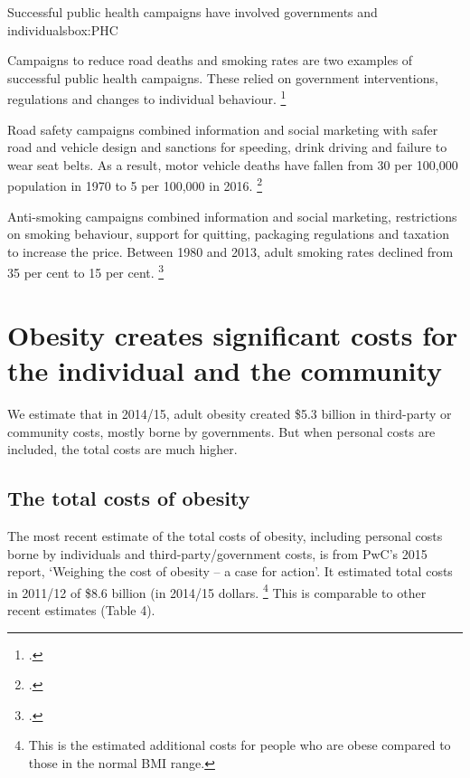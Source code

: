 \documentclass[embargoed]{grattan}
\begin{document}
\begin{smallbox}{Successful public health campaigns have involved governments and individuals}{box:PHC}

Campaigns to reduce road deaths and smoking rates are two examples of successful public health campaigns.
These relied on government interventions, regulations and changes to individual behaviour.%
\footcite{MacKay2011Legislativesolutionsunhealthy}

Road safety campaigns combined information and social marketing with safer road and vehicle design and sanctions for speeding, drink driving and failure to wear seat belts.
As a result, motor vehicle deaths have fallen from 30 per 100,000 population in 1970 to 5 per 100,000 in 2016.%
\footcites{BITRE2010RoaddeathsAustralia}{BITRE2010RoaddeathsAustralia}

Anti-smoking campaigns combined information and social marketing, restrictions on smoking behaviour, support for quitting, packaging regulations and taxation to increase the price.
Between 1980 and 2013, adult smoking rates declined from 35 per cent to 15 per cent.%
\footcite{Scollo2016TobaccoAustraliaFacts}
\end{smallbox}

\chapter{Obesity creates significant costs for the individual and the community}\label{obesity-creates-significant-costs-for-the-individual-and-society}

We estimate that in 2014/15, adult obesity created \$5.3 billion in third-party or community costs, mostly borne by governments.
But when personal costs are included, the total costs are much higher.

\section{The total costs of obesity }\label{the-total-costs-of-obesity}

The most recent estimate of the total costs of obesity, including personal costs borne by individuals and third-party/government costs, is from PwC's 2015 report, `Weighing the cost of obesity -- a case for action'.
It estimated total costs in 2011/12 of \$8.6 billion (in 2014/15 dollars.%
\footnote{This is the estimated additional costs for people who are obese compared to those in the normal BMI range.} This is comparable to other recent estimates (Table 4).
\end{document}

